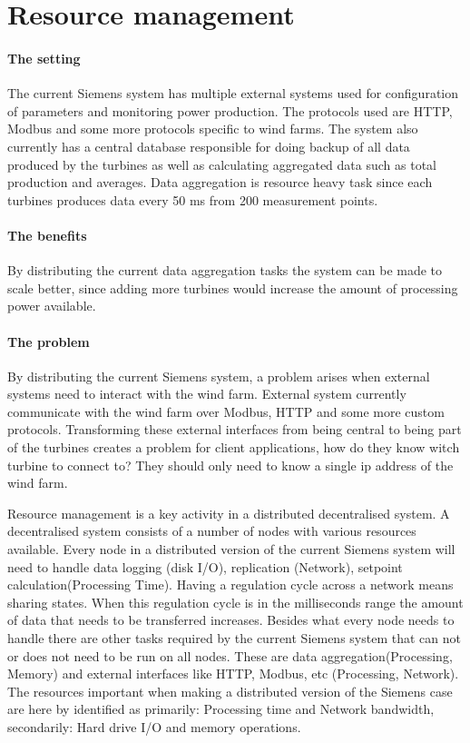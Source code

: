 \clearpage
\section{Resource management} %
\label{cha:resourceManagement}
\paragraph{The setting}
The current Siemens system has multiple external systems used for configuration of parameters and monitoring power production. The protocols used are HTTP, Modbus and some more protocols specific to wind farms. The system also currently has a central database responsible for doing backup of all data produced by the turbines as well as calculating aggregated data such as total production and averages. Data aggregation is resource heavy task since each turbines produces data every 50 ms from 200 measurement points.

\paragraph{The benefits}
By distributing the current data aggregation tasks the system can be made to scale better, since adding more turbines would increase the amount of processing power available.

\paragraph{The problem}
By distributing the current Siemens system, a problem arises when external systems need to interact with the wind farm. External system currently communicate with the wind farm over Modbus, HTTP and some more custom protocols.
Transforming these external interfaces from being central to being part of the turbines creates a problem for client applications, how do they know witch turbine to connect to? They should only need to know a single ip address of the wind farm.





Resource management is a key activity in a distributed decentralised system.
A decentralised system consists of a number of nodes with various resources available.
Every node in a distributed version of the current Siemens system will need to handle data logging (disk I/O), replication (Network), setpoint calculation(Processing Time).
Having a regulation cycle across a network means sharing states. When this regulation cycle is in the milliseconds range the amount of data that needs to be transferred increases.
Besides what every node needs to handle there are other tasks required by the current Siemens system that can not or does not need to be run on all nodes. These are data aggregation(Processing, Memory) and external interfaces like HTTP, Modbus, etc (Processing, Network).
The resources important when making a distributed version of the Siemens case are here by identified as primarily: Processing time and Network bandwidth, secondarily: Hard drive I/O and memory operations.

